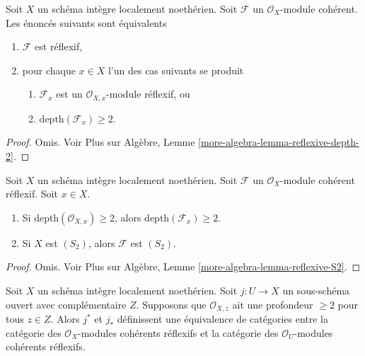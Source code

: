 \begin{lemma}
\label{lemma-reflexive-depth-2}
Soit  $X$  un schéma intègre localement noethérien. Soit  $\mathcal{F}$  un
 $\mathcal{O}_X$-module cohérent. Les énoncés suivants sont équivalents
\begin{enumerate}
\item $\mathcal{F}$  est réflexif,
\item pour chaque  $x \in X$  l'un des cas suivants se produit
\begin{enumerate}
\item $\mathcal{F}_x$  est un  $\mathcal{O}_{X, x}$-module réflexif, ou
\item $\text{depth}(\mathcal{F}_x) \geq 2$.
\end{enumerate}
\end{enumerate}
\end{lemma}

\begin{proof}
Omis. Voir Plus sur Algèbre, Lemme  \ref{more-algebra-lemma-reflexive-depth-2}.
\end{proof}

\begin{lemma}
\label{lemma-reflexive-S2}
Soit  $X$  un schéma intègre localement noethérien. Soit  $\mathcal{F}$  un
 $\mathcal{O}_X$-module cohérent réflexif. Soit  $x \in X$.
\begin{enumerate}
\item Si  $\text{depth}(\mathcal{O}_{X, x}) \geq 2$, alors  $\text{depth}(\mathcal{F}_x) \geq 2$.
\item Si  $X$  est  $(S_2)$, alors  $\mathcal{F}$  est  $(S_2)$.
\end{enumerate}
\end{lemma}

\begin{proof}
Omis. Voir Plus sur Algèbre, Lemme  \ref{more-algebra-lemma-reflexive-S2}.
\end{proof}

\begin{lemma}
\label{lemma-reflexive-S2-extend}
Soit  $X$  un schéma intègre localement noethérien. Soit  $j : U \to X$  un
sous-schéma ouvert avec complémentaire  $Z$. Supposons que  $\mathcal{O}_{X, z}$ 
ait une profondeur  $\geq 2$  pour tous  $z \in Z$. Alors  $j^*$  et
 $j_*$  définissent une équivalence de catégories entre la catégorie des
 $\mathcal{O}_X$-modules cohérents réflexifs et la catégorie des  $\mathcal{O}_U$-modules
cohérents réflexifs.
\end{lemma}

